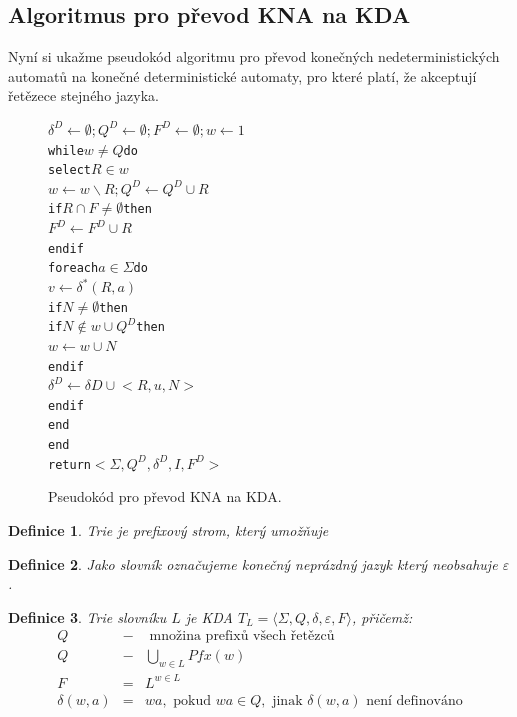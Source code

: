 \documentclass[10pt, a4paper, titlepage]{article}
\theoremstyle{note}
\newtheorem{definice}{\textbf{Definice}}
\begin{document}
\subsection{Algoritmus pro převod KNA na KDA}
Nyní si ukažme pseudokód algoritmu pro převod konečných nedeterministických automatů na konečné deterministické automaty, pro které platí, že
akceptují řetězece stejného jazyka.

\vspace{30px}
\begin{figure}[h]
\begin{alltt}
\( \delta^{D} \leftarrow \emptyset; Q^{D} \leftarrow \emptyset; F^{D} \leftarrow \emptyset; w \leftarrow {1} \)
while \( w \neq Q \) do
     select \( R \in w \)
     \( w \leftarrow w \smallsetminus {R}; Q^{D} \leftarrow Q^{D} \cup {R} \)
     if \( R \cap F \neq \emptyset \) then
         \( F^{D} \leftarrow F^{D} \cup {R} \)
     endif
     foreach \( a \in \Sigma \) do
         \( v \leftarrow \delta^{*}(R, a) \)
         if \( N \neq \emptyset \) then
             if \( N \notin w \cup Q^{D} \) then
                 \( w \leftarrow w \cup {N} \)
             endif
             \( \delta^{D} \leftarrow \delta{D} \cup {<R, u, N>} \)
         endif
     end
end
return \( <\Sigma, Q^{D}, \delta^{D}, I, F^{D}> \)
\end{alltt}
\caption{Pseudokód pro převod KNA na KDA.}
\end{figure}


\begin{definice}
\emph{Trie} je prefixový strom, který umožňuje 
\end{definice}

\begin{definice}
Jako \emph{slovník} označujeme konečný neprázdný jazyk který neobsahuje $\varepsilon$.
\end{definice}

\begin{definice}
Trie slovníku $L$ je KDA $T_{L} = \langle \Sigma, Q, \delta, \varepsilon, F \rangle$, přičemž:
\begin{eqnarray*}
Q &-& \text{ množina prefixů všech řetězců} \\
Q &-& \bigcup_{w \in L} Pfx(w) \\
F &=& L^{w \in L} \\
\delta(w,a) &=& wa, \text{ pokud } wa \in Q, \text{ jinak } \delta(w,a) \text{ není definováno}
\end{eqnarray*}
\end{definice}
\end{document}
